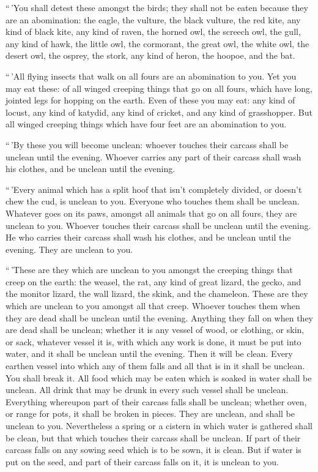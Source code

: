 ``\,'You shall detest these amongst the birds; they shall
not be eaten because they are an abomination: the eagle, the vulture,
the black vulture,  the red kite, any kind of black kite,
 any kind of raven,  the horned owl, the
screech owl, the gull, any kind of hawk,  the little owl,
the cormorant, the great owl,  the white owl, the desert
owl, the osprey,  the stork, any kind of heron, the hoopoe,
and the bat.

 ``\,'All flying insects that walk on all fours are an
abomination to you.  Yet you may eat these: of all winged
creeping things that go on all fours, which have long, jointed legs for
hopping on the earth.  Even of these you may eat: any kind
of locust, any kind of katydid, any kind of cricket, and any kind of
grasshopper.  But all winged creeping things which have
four feet are an abomination to you.

 ``\,'By these you will become unclean: whoever touches
their carcass shall be unclean until the evening.  Whoever
carries any part of their carcass shall wash his clothes, and be unclean
until the evening.

 ``\,'Every animal which has a split hoof that isn't
completely divided, or doesn't chew the cud, is unclean to you. Everyone
who touches them shall be unclean.  Whatever goes on its
paws, amongst all animals that go on all fours, they are unclean to you.
Whoever touches their carcass shall be unclean until the evening.
 He who carries their carcass shall wash his clothes, and
be unclean until the evening. They are unclean to you.

 ``\,'These are they which are unclean to you amongst the
creeping things that creep on the earth: the weasel, the rat, any kind
of great lizard,  the gecko, and the monitor lizard, the
wall lizard, the skink, and the chameleon.  These are they
which are unclean to you amongst all that creep. Whoever touches them
when they are dead shall be unclean until the evening. 
Anything they fall on when they are dead shall be unclean; whether it is
any vessel of wood, or clothing, or skin, or sack, whatever vessel it
is, with which any work is done, it must be put into water, and it shall
be unclean until the evening. Then it will be clean.  Every
earthen vessel into which any of them falls and all that is in it shall
be unclean. You shall break it.  All food which may be
eaten which is soaked in water shall be unclean. All drink that may be
drunk in every such vessel shall be unclean.  Everything
whereupon part of their carcass falls shall be unclean; whether oven, or
range for pots, it shall be broken in pieces. They are unclean, and
shall be unclean to you.  Nevertheless a spring or a
cistern in which water is gathered shall be clean, but that which
touches their carcass shall be unclean.  If part of their
carcass falls on any sowing seed which is to be sown, it is clean.
 But if water is put on the seed, and part of their carcass
falls on it, it is unclean to you.

